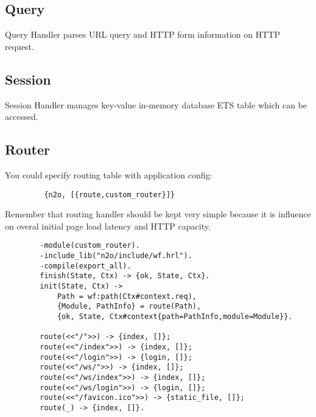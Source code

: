 \subsection{Query}
Query Handler parses URL query and HTTP form information on HTTP request.

\subsection{Session}
Session Handler manages key-value in-memory database ETS table which can be accessed.

\newpage
\subsection{Router}
You could specify routing table with application config:

\vspace{1\baselineskip}
\begin{lstlisting}
         {n2o, [{route,custom_router}]}
\end{lstlisting}
\vspace{1\baselineskip}

Remember that routing handler should be kept very simple because it is
influence on overal initial page load latency and HTTP capacity.

\vspace{1\baselineskip}
\begin{lstlisting}
        -module(custom_router).
        -include_lib("n2o/include/wf.hrl").
        -compile(export_all).
        finish(State, Ctx) -> {ok, State, Ctx}.
        init(State, Ctx) -> 
            Path = wf:path(Ctx#context.req),
            {Module, PathInfo} = route(Path),
            {ok, State, Ctx#context{path=PathInfo,module=Module}}.

        route(<<"/">>) -> {index, []};
        route(<<"/index">>) -> {index, []};
        route(<<"/login">>) -> {login, []};
        route(<<"/ws/">>) -> {index, []};
        route(<<"/ws/index">>) -> {index, []};
        route(<<"/ws/login">>) -> {login, []};
        route(<<"/favicon.ico">>) -> {static_file, []};
        route(_) -> {index, []}.
\end{lstlisting}
